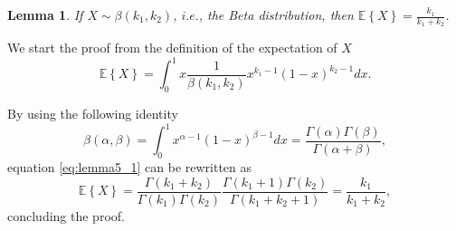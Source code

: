 \documentclass[10pt,journal,comsoc,final]{IEEEtran}
\newtheorem{lemma}{Lemma}
\begin{document}
\begin{lemma} If $X \sim \beta(k_1,k_2)$, $i.e.$, the Beta distribution, then $\mathbb{E}  \left\lbrace X \right\rbrace  = \frac{k_1}{k_1 + k_2}$.
\end{lemma}
\begin{IEEEproof} We start the proof from the definition of the expectation of $X$
\begin{equation}\label{eq:lemma5_1}
\mathbb{E} \left\lbrace X \right\rbrace = \int_{0}^{1} x \frac{1}{\beta(k_1,k_2)} x^{k_{1} - 1 }(1 - x)^{k_{2} - 1} dx.
\end{equation}

By using the following identity 
\begin{equation}\label{eq:lemma5_2}
\beta(\alpha, \beta) = \int_{0}^{1} x^{\alpha -1} (1 - x)^{\beta - 1} dx = \frac{\Gamma(\alpha) \Gamma(\beta)}{ \Gamma(\alpha + \beta)},
\end{equation}
equation \eqref{eq:lemma5_1} can be rewritten as 
\begin{equation}\label{eq:lemma5_3}
\mathbb{E} \left\lbrace X \right\rbrace = \frac{\Gamma(k_1 + k_2)}{ \Gamma(k_1)\Gamma(k_2)}    \frac{\Gamma(k_1 + 1) \Gamma(k_2)}{ \Gamma(k_1 + k_2 + 1)} = \frac{k_1}{k_1 + k_2},
\end{equation}
concluding the proof.
\end{IEEEproof}
\end{document}
